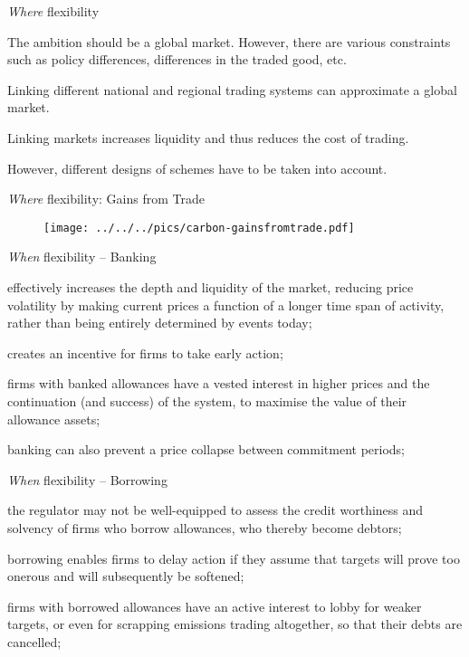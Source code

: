 {{\it Where} flexibility}


	The ambition should be a global market. However, there are various constraints such as policy differences, differences in the traded good, etc.

	Linking different national and regional trading systems can approximate a global market.

	Linking markets increases liquidity and thus reduces the cost of trading.

	However, different designs of schemes have to be taken into account.


{{\it Where} flexibility: Gains from Trade}
\begin{center}
\begin{figure}[h!]
\centering
\texttt{[image: ../../../pics/carbon-gainsfromtrade.pdf]}
\end{figure}
\end{center}

{{\it When} flexibility  -- Banking}


	effectively increases the depth and liquidity of the market, reducing price volatility by
making current prices a function of a longer time span of activity, rather than being
entirely determined by events today;

	creates an incentive for firms to take early action;

	firms with banked allowances have a
vested interest in higher prices and the continuation (and success) of the system, to maximise the value of
their allowance assets;

	banking can also prevent a price collapse between commitment
periods;


{{\it When} flexibility -- Borrowing}


	the regulator may not be well-equipped to assess the credit worthiness and
solvency of firms who borrow allowances, who thereby become debtors;

	borrowing enables firms to delay action if they assume that targets will prove too
onerous and will subsequently be softened;

	firms with borrowed allowances have an active interest to lobby for weaker targets,
or even for scrapping emissions trading altogether, so that their debts are cancelled;

